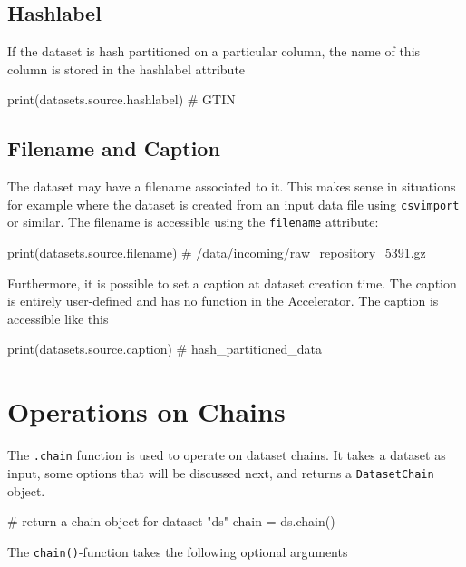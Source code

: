 \subsection{Hashlabel}
If the dataset is hash partitioned on a particular column, the name of
this column is stored in the hashlabel attribute
\begin{python}
print(datasets.source.hashlabel)
# GTIN
\end{python}



\subsection{Filename and Caption}
The dataset may have a filename associated to it.  This makes sense in
situations for example where the dataset is created from an input data
file using \texttt{csvimport} or similar.  The filename is accessible
using the \texttt{filename} attribute:
\begin{python}
print(datasets.source.filename)
# /data/incoming/raw_repository_5391.gz
\end{python}
Furthermore, it is possible to set a caption at dataset creation time.
The caption is entirely user-defined and has no function in the
Accelerator.  The caption is accessible like this
\begin{python}
print(datasets.source.caption)
# hash_partitioned_data
\end{python}



\section{Operations on Chains}
The \texttt{.chain} function is used to operate on dataset chains.  It
takes a dataset as input, some options that will be discussed next,
and returns a \texttt{DatasetChain} object.
\begin{python}
# return a chain object for dataset "ds"
chain = ds.chain()
\end{python}
The \texttt{chain()}-function takes the following optional arguments

